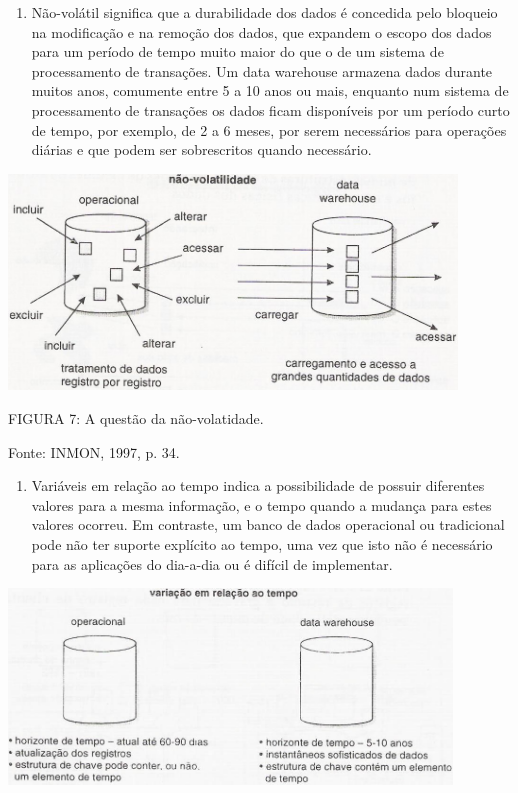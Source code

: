 \documentclass[a4paper]{article}
\newcounter{saveenum}
\newcommand\liststyleWWviiiNumxii{%
\renewcommand\theenumi{\alph{enumi}}
\renewcommand\theenumii{\arabic{enumii}}
\renewcommand\theenumiii{\arabic{enumiii}}
\renewcommand\theenumiv{\arabic{enumiv}}
\renewcommand\labelenumi{\theenumi)}
\renewcommand\labelenumii{\theenumii.}
\renewcommand\labelenumiii{\theenumiii.}
\renewcommand\labelenumiv{\theenumiv.}
}
\begin{document}
\liststyleWWviiiNumxii
\setcounter{saveenum}{\value{enumi}}
\begin{enumerate}
\setcounter{enumi}{\value{saveenum}}
\item {
\textsf{N\~ao-vol\'atil significa que a durabilidade dos dados \'e concedida pelo bloqueio na modifica\c{c}\~ao e na
remo\c{c}\~ao dos dados, que expandem o escopo dos dados para um per\'iodo de tempo muito maior do que o de um sistema
de processamento de transa\c{c}\~oes. Um data warehouse armazena dados durante muitos anos, comumente entre 5 a 10 anos
ou mais, enquanto num sistema de processamento de transa\c{c}\~oes os dados ficam dispon\'iveis por um per\'iodo curto
de tempo, por exemplo, de 2 a 6 meses, por serem necess\'arios para opera\c{c}\~oes di\'arias e que podem ser
sobrescritos quando necess\'ario. }}
\end{enumerate}
 \includegraphics[width=11.91cm,height=5.731cm]{monograph-img007.jpg} 

{
\textsf{\MakeUppercase{FIGURA }}\textsf{7: A quest\~ao da n\~ao-volatidade. }}

{
\textsf{Fonte: INMON, 1997, p. 34. \ }}

\liststyleWWviiiNumxii
\setcounter{saveenum}{\value{enumi}}
\begin{enumerate}
\setcounter{enumi}{\value{saveenum}}
\item {
\textsf{Vari\'aveis em rela\c{c}\~ao ao tempo indica a possibilidade de possuir diferentes valores para a mesma
informa\c{c}\~ao, e o tempo quando a mudan\c{c}a para estes valores ocorreu. Em contraste, um banco de dados
operacional ou tradicional pode n\~ao ter suporte expl\'icito ao tempo, uma vez que isto n\~ao \'e necess\'ario para as
aplica\c{c}\~oes do dia-a-dia ou \'e dif\'icil de implementar.}}
\end{enumerate}
 \includegraphics[width=11.77cm,height=5.203cm]{monograph-img008.jpg} 
\end{document}
